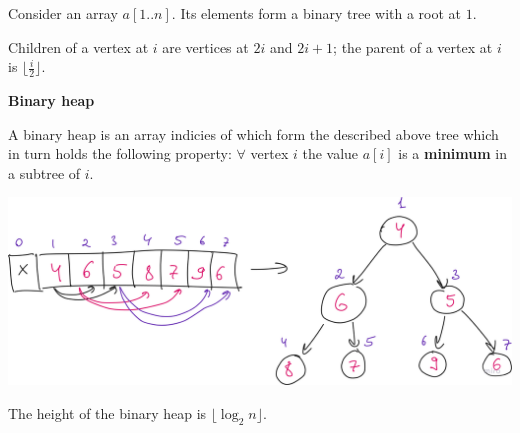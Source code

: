 
Consider an array $a[1..n]$. Its elements form a binary tree with a root at $1$.

Children of a vertex at $i$ are vertices at $2i$ and $2i+1$; the parent of a vertex at $i$ is $\lfloor \frac{i}{2} \rfloor$.

\begin{definition}\textbf{Binary heap}

    A binary heap is an array indicies of which form the described above tree which in turn holds the following property: $\forall$ vertex $i$ the value $a[i]$ is a \textbf{minimum} in a subtree of $i$.

    \begin{center}
        \includegraphics[scale=0.25]{./assets/12-binary-heap/1.png}
    \end{center}

\end{definition}

\begin{lemma}

    The height of the binary heap is $\lfloor \log_{2}{n} \rfloor$.

\end{lemma}

